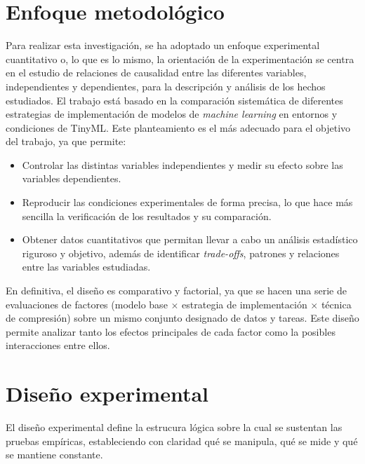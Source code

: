 \documentclass[a4paper,12pt,twoside,final]{book}
\begin{document}
\section{Enfoque metodológico}
Para realizar esta investigación, se ha adoptado un enfoque experimental cuantitativo o, lo que es lo mismo, la
orientación de la experimentación se centra en el estudio de relaciones de causalidad entre las diferentes variables,
independientes y dependientes, para la descripción y análisis de los hechos estudiados. El trabajo está basado en la
comparación sistemática de diferentes estrategias de implementación de modelos de \textit{machine learning} en
entornos y condiciones de TinyML. Este planteamiento es el más adecuado para el objetivo del trabajo, ya que permite:
\begin{itemize}
  \item Controlar las distintas variables independientes y medir su efecto sobre las variables dependientes.
  \item Reproducir las condiciones experimentales de forma precisa, lo que hace más sencilla la verificación de los
  resultados y su comparación.
  \item Obtener datos cuantitativos que permitan llevar a cabo un análisis estadístico riguroso y objetivo, además de
  identificar \textit{trade-offs}, patrones y relaciones entre las variables estudiadas.
\end{itemize}

En definitiva, el diseño es comparativo y factorial, ya que se hacen una serie de evaluaciones de factores (modelo
base $\times$ estrategia de implementación $\times$ técnica de compresión) sobre un mismo conjunto designado de datos
y tareas. Este diseño permite analizar tanto los efectos principales de cada factor como la posibles interacciones
entre ellos.

\section{Diseño experimental}
El diseño experimental define la estrucura lógica sobre la cual se sustentan las pruebas empíricas, estableciendo con
claridad qué se manipula, qué se mide y qué se mantiene constante.
\end{document}
